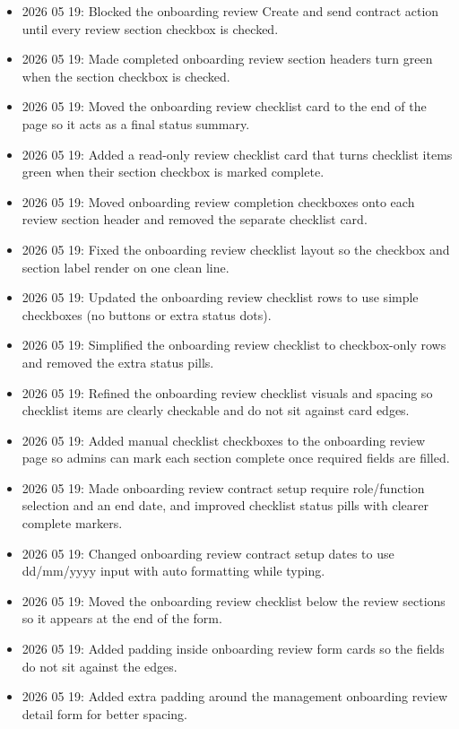\documentclass[11pt]{article}
\begin{document}
\begin{itemize}
    \item 2026 05 19: Blocked the onboarding review Create and send contract action until every review section checkbox is checked.
    \item 2026 05 19: Made completed onboarding review section headers turn green when the section checkbox is checked.
    \item 2026 05 19: Moved the onboarding review checklist card to the end of the page so it acts as a final status summary.
    \item 2026 05 19: Added a read-only review checklist card that turns checklist items green when their section checkbox is marked complete.
    \item 2026 05 19: Moved onboarding review completion checkboxes onto each review section header and removed the separate checklist card.
    \item 2026 05 19: Fixed the onboarding review checklist layout so the checkbox and section label render on one clean line.
    \item 2026 05 19: Updated the onboarding review checklist rows to use simple checkboxes (no buttons or extra status dots).
    \item 2026 05 19: Simplified the onboarding review checklist to checkbox-only rows and removed the extra status pills.
    \item 2026 05 19: Refined the onboarding review checklist visuals and spacing so checklist items are clearly checkable and do not sit against card edges.
    \item 2026 05 19: Added manual checklist checkboxes to the onboarding review page so admins can mark each section complete once required fields are filled.
    \item 2026 05 19: Made onboarding review contract setup require role/function selection and an end date, and improved checklist status pills with clearer complete markers.
    \item 2026 05 19: Changed onboarding review contract setup dates to use dd/mm/yyyy input with auto formatting while typing.
    \item 2026 05 19: Moved the onboarding review checklist below the review sections so it appears at the end of the form.
    \item 2026 05 19: Added padding inside onboarding review form cards so the fields do not sit against the edges.
    \item 2026 05 19: Added extra padding around the management onboarding review detail form for better spacing.

\end{itemize}
\end{document}
